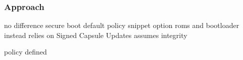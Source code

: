 \subsubsection{Approach}

no difference
secure boot default policy snippet
option roms and bootloader
instead relies on Signed Capsule Updates
assumes integrity

\cite[32.3]{uefi-spec}

policy defined
\cite[32.5.3.3 Authorization Process]{uefi-spec}
